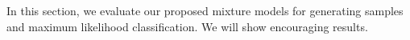 


In this section, we evaluate our proposed mixture models for generating samples and maximum likelihood classification. We will show encouraging results.


